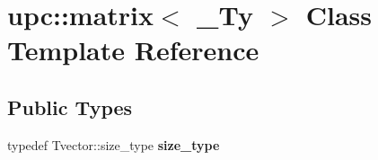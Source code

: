 \hypertarget{classupc_1_1matrix}{}\section{upc\+:\+:matrix$<$ \+\_\+\+Ty $>$ Class Template Reference}
\label{classupc_1_1matrix}
\subsection*{Public Types}
\begin{DoxyCompactItemize}
\item 
\mbox{\label{classupc_1_1matrix_a0f2b47f0fc08216f8e0ef1cc1c022663}} 
typedef Tvector\+::size\+\_\+type {\bfseries size\+\_\+type}
\end{DoxyCompactItemize}

